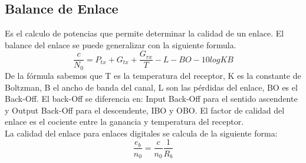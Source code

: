 	\subsection{Balance de Enlace}
	\label{sub:balance}
		Es el calculo de potencias que permite determinar la calidad de un enlace. El balance del enlace se puede generalizar con la siguiente formula.
		\begin{equation}
			\tag{Balance de enlace}
			\frac{c}{N_0}=P_{tx}+G_{tx}+\frac{G_{rx}}{T}-L-BO-10logKB
		\end{equation}
		De la fórmula sabemos que T es la temperatura del receptor, K es la constante de Boltzman, B el ancho de banda del canal, L son las pérdidas del enlace, BO es el Back-Off. El back-Off se diferencia en: Input Back-Off para el sentido ascendente y Output Back-Off para el descendente, \acrshort{IBO} y \acrshort{OBO}. El factor de calidad del enlace es el cociente entre la ganancia y temperatura del receptor.\\
		La calidad del enlace para enlaces digitales se calcula de la siguiente forma:
		\begin{equation}
			\tag{Balance de enlace digital}
			\frac{e_b}{n_0}=\frac{c}{n_0}\frac{1}{R_b}
		\end{equation}
